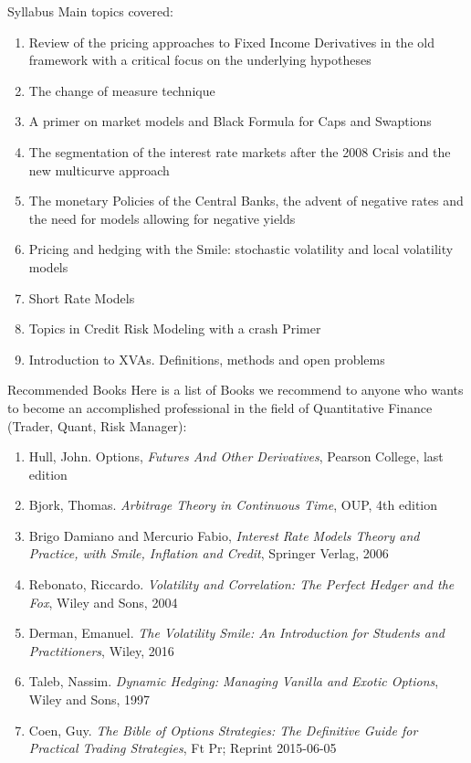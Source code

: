 \documentclass{beamer}
\begin{document}
\begin{frame}{Syllabus}
	Main topics covered:
	\begin{enumerate}	
	\item \textcolor{maincolor}{Review of the pricing approaches to Fixed Income Derivatives in the old framework with a critical focus on the underlying hypotheses}
	\item \textcolor{maincolor}{The change of measure technique}
	\item \textcolor{maincolor}{A primer on market models and Black Formula for Caps and Swaptions}
	\item The segmentation of the interest rate markets after the 2008 Crisis and the new multicurve approach
	\item The monetary Policies of the Central Banks, \textcolor{maincolor}{the advent of negative rates and the need for models allowing for negative yields}
	\item Pricing and hedging with the Smile: stochastic volatility and local volatility models
	\item Short Rate Models 
	\item Topics in Credit Risk Modeling with a crash Primer
	\item Introduction to XVAs. Definitions, methods and open problems
	\end{enumerate}
\end{frame}

\begin{frame}{Recommended Books}
	Here is a list of Books we recommend to anyone who wants to become an accomplished professional in the field of Quantitative Finance (Trader, Quant, Risk Manager):
	\begin{enumerate}
	\item Hull, John. Options, \textit{Futures And Other Derivatives}, Pearson College, last edition
	\item Bjork, Thomas. \textit{Arbitrage Theory in Continuous Time}, OUP, 4th edition
	\item Brigo Damiano and Mercurio Fabio, \textit{Interest Rate Models Theory and Practice, with Smile, Inflation and Credit}, Springer Verlag, 2006
	\item Rebonato, Riccardo. \textit{Volatility and Correlation: The Perfect Hedger and the Fox}, Wiley and Sons, 2004
	\item Derman, Emanuel. \textit{The Volatility Smile: An Introduction for Students and Practitioners}, Wiley, 2016
	\item Taleb, Nassim. \textit{Dynamic Hedging: Managing Vanilla and Exotic Options}, Wiley and Sons, 1997
	\item Coen, Guy. \textit{The Bible of Options Strategies: The Definitive Guide for Practical Trading Strategies}, Ft Pr; Reprint 2015-06-05
\end{enumerate}
\end{frame}
\end{document}
